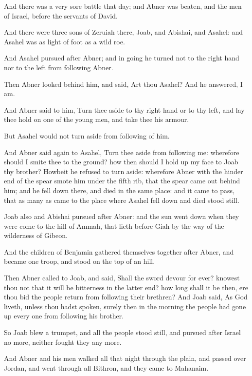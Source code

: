 \verse And there was a very sore battle that day; and Abner was beaten, and the men of Israel, before the servants of David.

\verse And there were three sons of Zeruiah there, Joab, and Abishai, and Asahel: and Asahel was as light of foot as a wild roe.

\verse And Asahel pursued after Abner; and in going he turned not to the right hand nor to the left from following Abner.

\verse Then Abner looked behind him, and said, Art thou Asahel? And he answered, I am.

\verse And Abner said to him, Turn thee aside to thy right hand or to thy left, and lay thee hold on one of the young men, and take thee his armour.

But Asahel would not turn aside from following of him.

\verse And Abner said again to Asahel, Turn thee aside from following me: wherefore should I smite thee to the ground? how then should I hold up my face to Joab thy brother?  \verse Howbeit he refused to turn aside: wherefore Abner with the hinder end of the spear smote him under the fifth rib, that the spear came out behind him; and he fell down there, and died in the same place: and it came to pass, that as many as came to the place where Asahel fell down and died stood still.

\verse Joab also and Abishai pursued after Abner: and the sun went down when they were come to the hill of Ammah, that lieth before Giah by the way of the wilderness of Gibeon.

\verse And the children of Benjamin gathered themselves together after Abner, and became one troop, and stood on the top of an hill.

\verse Then Abner called to Joab, and said, Shall the sword devour for ever?  knowest thou not that it will be bitterness in the latter end?  how long shall it be then, ere thou bid the people return from following their brethren?  \verse And Joab said, As God liveth, unless thou hadst spoken, surely then in the morning the people had gone up every one from following his brother.

\verse So Joab blew a trumpet, and all the people stood still, and pursued after Israel no more, neither fought they any more.

\verse And Abner and his men walked all that night through the plain, and passed over Jordan, and went through all Bithron, and they came to Mahanaim.

